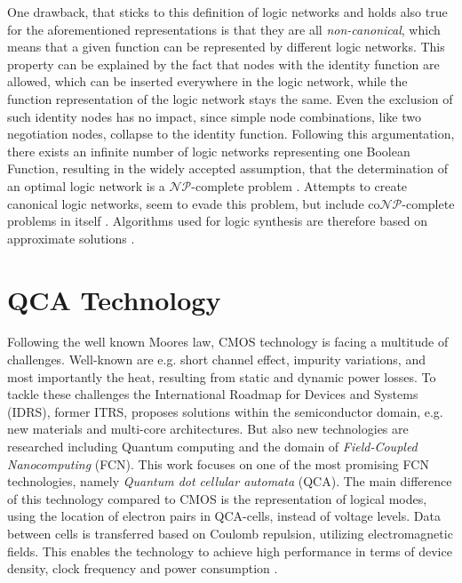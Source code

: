 One drawback, that sticks to this definition of logic networks and holds also true for the aforementioned representations is that they are all \textit{non-canonical}, which means that a given function can be represented by different logic networks. This property can be explained by the fact that nodes with the identity function are allowed, which can be inserted everywhere in the logic network, while the function representation of the logic network stays the same. Even the exclusion of such identity nodes has no impact, since simple node combinations, like two negotiation nodes, collapse to the identity function. Following this argumentation, there exists an infinite number of logic networks representing one Boolean Function, resulting in the widely accepted assumption, that the determination of an optimal logic network is a $\mathcal{NP}$-complete problem \cite{Walter}. Attempts to create canonical logic networks, seem to evade this problem, but include co$\mathcal{NP}$-complete problems in itself \cite{LogicNetwork}. Algorithms used for logic synthesis are therefore based on approximate solutions .


\section{QCA Technology}

Following the well known Moores law, CMOS technology is facing a multitude of challenges. Well-known are e.g. short channel effect, impurity variations, and most importantly the heat, resulting from static and dynamic power losses. To tackle these challenges the International Roadmap for Devices and Systems (IDRS), former ITRS, proposes solutions within the semiconductor domain, e.g. new materials and multi-core architectures. But also new technologies are researched including Quantum computing and the domain of \textit{Field-Coupled Nanocomputing} (FCN). This work focuses on one of the most promising FCN technologies, namely \textit{Quantum dot cellular automata} (QCA). The main difference of this technology compared to CMOS is the representation of logical modes, using the location of electron pairs in QCA-cells, instead of voltage levels. Data between cells is transferred based on Coulomb repulsion, utilizing electromagnetic fields. This enables the technology to achieve high performance in terms of device density, clock frequency and power consumption \cite{mohammadi2016efficient}.

